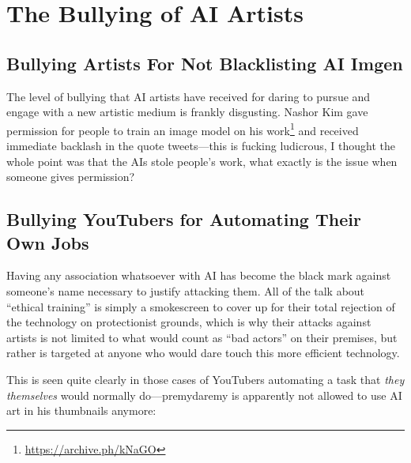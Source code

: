 \documentclass[11pt]{article}
\begin{document}
\section*{The Bullying of AI Artists}
\label{sec:org472c689}
\subsection*{Bullying Artists For Not Blacklisting AI Imgen}
\label{sec:orga821cfd}
The level of bullying that AI artists have received for daring to pursue and engage with a new artistic medium is frankly disgusting. Nashor Kim gave permission for people to train an image model on his work\footnote{\url{https://archive.ph/kNaGO}} and received immediate backlash in the quote tweets---this is fucking ludicrous, I thought the whole point was that the AIs stole people's work, what exactly is the issue when someone gives permission?

\subsection*{Bullying YouTubers for Automating Their Own Jobs}
\label{sec:org74693de}
Having any association whatsoever with AI has become the black mark against someone's name necessary to justify attacking them. All of the talk about ``ethical training'' is simply a smokescreen to cover up for their total rejection of the technology on protectionist grounds, which is why their attacks against artists is not limited to what would count as ``bad actors'' on their premises, but rather is targeted at anyone who would dare touch this more efficient technology.

This is seen quite clearly in those cases of YouTubers automating a task that \emph{they themselves} would normally do---premydaremy is apparently not allowed to use AI art in his thumbnails anymore:
\end{document}
